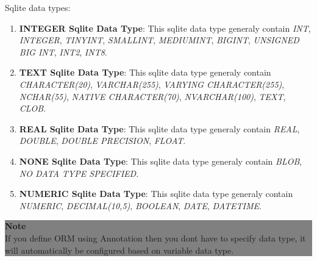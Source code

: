 \par
Sqlite data types:
	
\begin{enumerate}

	\item \small \textbf{INTEGER Sqlite Data Type}: This sqlite data type generaly contain \textit{INT}, \textit{INTEGER}, \textit{TINYINT}, \textit{SMALLINT}, \textit{MEDIUMINT}, \textit{BIGINT}, \textit{UNSIGNED BIG INT}, \textit{INT2}, \textit{INT8}.
	
	\item \small \textbf{TEXT Sqlite Data Type}: This sqlite data type generaly contain \textit{CHARACTER(20)}, \textit{VARCHAR(255)}, \textit{VARYING CHARACTER(255)}, \textit{NCHAR(55)}, \textit{NATIVE CHARACTER(70)}, \textit{NVARCHAR(100)}, \textit{TEXT}, \textit{CLOB}.

	\item \small \textbf{REAL Sqlite Data Type}: This sqlite data type generaly contain \textit{REAL}, \textit{DOUBLE}, \textit{DOUBLE PRECISION}, \textit{FLOAT}.
	
	\item \small \textbf{NONE Sqlite Data Type}: This sqlite data type generaly contain \textit{BLOB}, \textit{NO DATA TYPE SPECIFIED}.

	\item \small \textbf{NUMERIC Sqlite Data Type}: This sqlite data type generaly contain \textit{NUMERIC}, \textit{DECIMAL(10,5)}, \textit{BOOLEAN}, \textit{DATE}, \textit{DATETIME}.

\end{enumerate}


					\begin{center}
						\colorbox{grey}{
						\parbox[t]{.8\linewidth}{
							\fontsize{11pt}{11pt}\selectfont %
							\vspace*{0.1cm} %
		
							\hfill \textbf{Note} \\
							If you define ORM using Annotation then you dont have to specify data type, it will automatically be configured based on variable data type.
				
							\vspace*{0.0cm} %
						}
					}

					\end{center}



